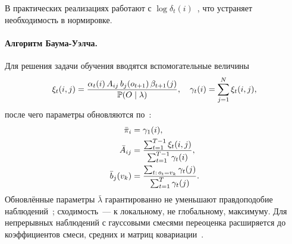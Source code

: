 В практических реализациях работают с
$\log\delta_t(i)$~\cite[уравн.~104--105]{Rabiner1989}, что
устраняет необходимость в нормировке.

\paragraph*{Алгоритм Баума-Уэлча.} Для решения задачи обучения
вводятся вспомогательные величины
\begin{equation}
\xi_t(i,j) = \frac{\alpha_t(i)\,A_{ij}\,b_j(o_{t+1})\,
                   \beta_{t+1}(j)}{\Prb(O\mid\lambda)},
\quad
\gamma_t(i) = \sum_{j=1}^N \xi_t(i,j),
\eqlab{baum-welch-aux}
\end{equation}
после чего параметры обновляются
по~\cite[уравн.~40a--40c]{Rabiner1989}:
\begin{align}
\bar\pi_i  &= \gamma_1(i),
\eqlab{bw-pi} \\
\bar A_{ij} &= \frac{\sum_{t=1}^{T-1}\xi_t(i,j)}
                    {\sum_{t=1}^{T-1}\gamma_t(i)},
\eqlab{bw-a} \\
\bar b_j(v_k) &= \frac{\sum_{t:\,o_t=v_k}\gamma_t(j)}
                      {\sum_{t=1}^{T}\gamma_t(j)}.
\eqlab{bw-b}
\end{align}
Обновлённые параметры $\bar\lambda$ гарантированно не уменьшают
правдоподобие наблюдений~\cite[\S~III-C]{Rabiner1989}; сходимость~---
к локальному, не глобальному, максимуму. Для непрерывных
наблюдений с гауссовыми смесями переоценка расширяется до
коэффициентов смеси, средних и матриц ковариации~\cite[уравн.~52--54]{Rabiner1989}.
